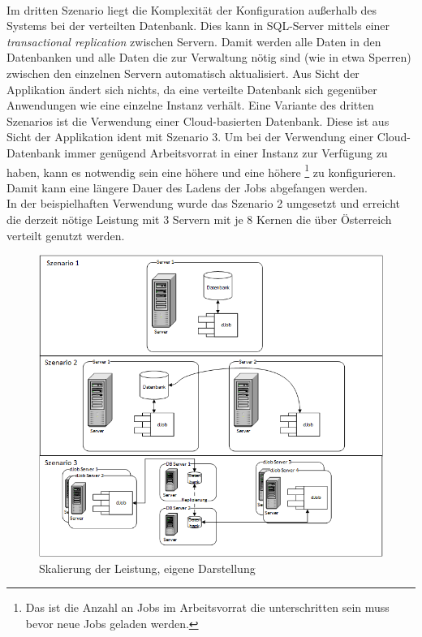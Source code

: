\\Im dritten Szenario liegt die Komplexität der Konfiguration außerhalb des Systems bei der verteilten Datenbank. Dies kann in SQL-Server mittels einer \emph{transactional replication} zwischen Servern.\parencite{ms_resolve} Damit werden alle Daten in den Datenbanken und alle Daten die zur Verwaltung nötig sind (wie in etwa Sperren) zwischen den einzelnen Servern automatisch aktualisiert. Aus Sicht der Applikation ändert sich nichts, da eine verteilte Datenbank sich gegenüber Anwendungen wie eine einzelne Instanz verhält. Eine Variante des dritten Szenarios ist die Verwendung einer Cloud-basierten Datenbank. Diese ist aus Sicht der Applikation ident mit Szenario 3. Um bei der Verwendung einer Cloud-Datenbank immer genügend Arbeitsvorrat in einer Instanz zur Verfügung zu haben, kann es notwendig sein eine höhere  und eine höhere \footnote{Das ist die Anzahl an Jobs im Arbeitsvorrat die unterschritten sein muss bevor neue Jobs geladen werden.} zu konfigurieren. Damit kann eine längere Dauer des Ladens der Jobs abgefangen werden.
\\In der beispielhaften Verwendung wurde das Szenario 2 umgesetzt und erreicht die derzeit nötige Leistung mit 3 Servern mit je 8 Kernen die über Österreich verteilt genutzt werden.
\begin{figure}
	\centering
	\includegraphics[width=0.7\linewidth]{images/scaling}
	\caption{Skalierung der Leistung, eigene Darstellung}
	\label{fig:performance_scaling}
\end{figure}

